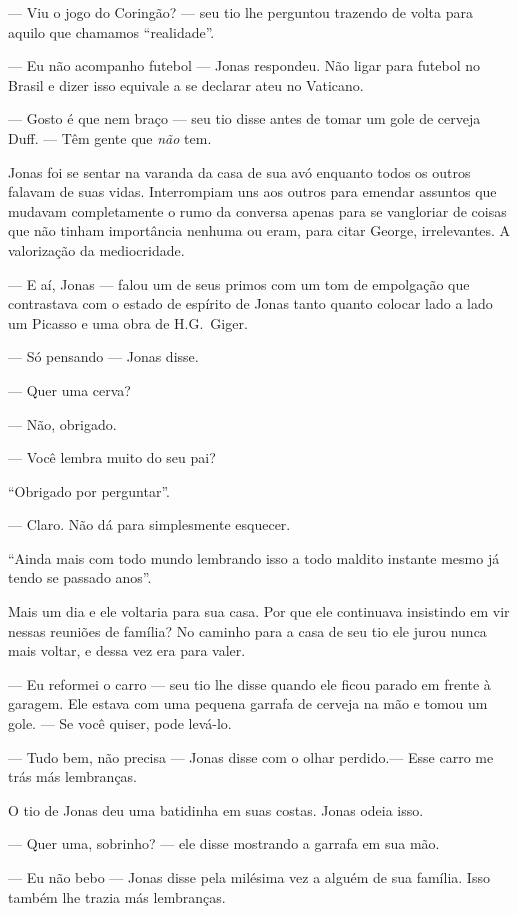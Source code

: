 --- Viu o jogo do Coringão? --- seu tio lhe perguntou\mudanca{,} trazendo de volta para aquilo que chamamos ``realidade''.

--- Eu não acompanho futebol --- Jonas respondeu. Não ligar para futebol no Brasil e dizer isso equivale a se declarar ateu no Vaticano.

--- Gosto é que nem braço --- seu tio disse\mudanca{,} antes de tomar um gole de cerveja Duff. --- Têm gente que \emph{não} tem.

Jonas foi se sentar na varanda da casa de sua avó enquanto todos os outros falavam de suas vidas. Interrompiam uns aos outros para emendar assuntos que mudavam completamente o rumo da conversa apenas para se vangloriar de coisas que não tinham importância nenhuma ou eram, para citar George, irrelevantes. A valorização da mediocridade.

--- E aí, Jonas --- falou um de seus primos com um tom de empolgação que contrastava com o estado de espírito de Jonas tanto quanto colocar lado a lado um Picasso e uma obra de H.G.~Giger.

--- Só pensando --- Jonas disse.

--- Quer uma cerva?

--- Não, obrigado.

--- Você lembra muito do seu pai?

``Obrigado por perguntar''.

--- Claro. Não dá para simplesmente esquecer.

``Ainda mais com todo mundo  lembrando isso a todo maldito instante\mudanca{,} mesmo já tendo se passado anos''.

Mais um dia e ele voltaria para sua casa. Por que ele continuava insistindo em vir nessas reuniões de família? No caminho para a casa de seu tio ele jurou nunca mais voltar, e dessa vez era para valer.

--- Eu reformei o carro --- seu tio lhe disse quando ele ficou parado em frente à garagem. Ele estava com uma pequena garrafa de cerveja na mão e tomou um gole. --- Se você quiser, pode levá-lo.

--- Tudo bem, não precisa --- Jonas disse com o olhar perdido.--- Esse carro me trás más lembranças.

O tio de Jonas deu uma batidinha em suas costas. Jonas odeia isso.

--- Quer uma, sobrinho? --- ele disse mostrando a garrafa em sua mão.

--- Eu não bebo --- Jonas disse pela milésima vez a alguém de sua família. Isso também lhe trazia más lembranças.

